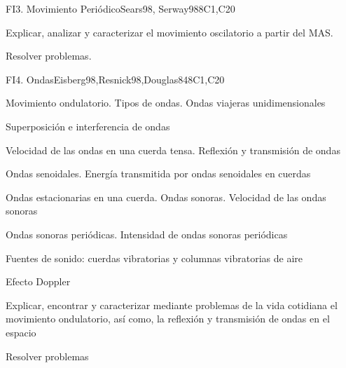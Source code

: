 \begin{syllabus}
\begin{unit}{FI3. Movimiento Periódico}{Sears98, Serway98}{}{8}{C1,C20}
   \begin{learningoutcomes}
         \item  Explicar, analizar y caracterizar el movimiento oscilatorio a partir del MAS.
         \item  Resolver problemas.
   \end{learningoutcomes}
\end{unit}

\begin{unit}{FI4. Ondas}{Eisberg98,Resnick98,Douglas84}{}{8}{C1,C20}
\begin{topics}
         \item  Movimiento ondulatorio. Tipos de ondas. Ondas viajeras unidimensionales
	 \item  Superposición e interferencia de ondas
         \item  Velocidad de las ondas en una cuerda tensa. Reflexión y transmisión de ondas
	 \item  Ondas senoidales. Energía transmitida por ondas senoidales en cuerdas
         \item  Ondas estacionarias en una cuerda. Ondas sonoras. Velocidad de las ondas sonoras
	 \item  Ondas sonoras periódicas. Intensidad de ondas sonoras periódicas
	 \item  Fuentes de sonido: cuerdas vibratorias y columnas vibratorias de aire
	 \item  Efecto Doppler
   \end{topics}

   \begin{learningoutcomes}
         \item  Explicar, encontrar y caracterizar mediante problemas de la vida cotidiana el movimiento ondulatorio, así como, la reflexión y transmisión de ondas en el espacio
         \item  Resolver problemas
   \end{learningoutcomes}
\end{unit}


\end{syllabus}
